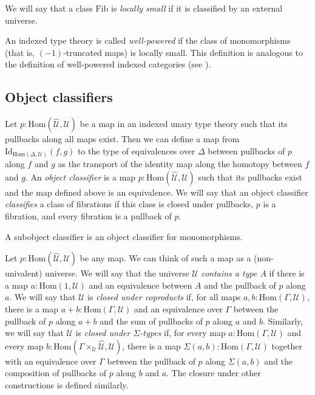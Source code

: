 \documentclass[reqno]{amsart}
\theoremstyle{definition}
\theoremstyle{remark}
\newcommand{\fs}[1]{\mathrm{#1}}
\newcommand{\Hom}{\fs{Hom}}
\newcommand{\Id}{\fs{Id}}
\newcommand{\Fib}{\fs{Fib}}
\numberwithin{figure}{section}
\begin{document}
\begin{defn}
We will say that a class $\Fib$ is \emph{locally small} if it is classified by an external universe.
\end{defn}

\begin{example}
An indexed type theory is called \emph{well-powered} if the class of monomorphisms (that is, $(-1)$-truncated maps) is locally small.
This definition is analogous to the definition of well-powered indexed categories (see \cite[Example~B1.3.14]{elephant}).
\end{example}

\subsection{Object classifiers}

Let $p : \Hom(\widehat{\mathcal{U}},\mathcal{U})$ be a map in an indexed unary type theory such that its pullbacks along all maps exist.
Then we can define a map from $\Id_{\Hom(\Delta,\mathcal{U})}(f,g)$ to the type of equivalences over $\Delta$ between pullbacks of $p$ along $f$ and $g$ as the transport of the identity map along the homotopy between $f$ and $g$.
An \emph{object classifier} is a map $p : \Hom(\widehat{\mathcal{U}},\mathcal{U})$ such that its pullbacks exist and the map defined above is an equivalence.
We will say that an object classifier \emph{classifies} a class of fibrations if this class is closed under pullbacks, $p$ is a fibration, and every fibration is a pullback of $p$.

\begin{example}
A subobject classifier is an object classifier for monomorphisms.
\end{example}

Let $p : \Hom(\widehat{\mathcal{U}},\mathcal{U})$ be any map.
We can think of such a map as a (non-univalent) universe.
We will say that the universe $\mathcal{U}$ \emph{contains a type $A$} if there is a map $a : \Hom(1,\mathcal{U})$ and an equivalence between $A$ and the pullback of $p$ along $a$.
We will say that $\mathcal{U}$ is \emph{closed under coproducts} if, for all maps $a,b : \Hom(\Gamma,\mathcal{U})$, there is a map $a + b : \Hom(\Gamma,\mathcal{U})$
and an equivalence over $\Gamma$ between the pullback of $p$ along $a + b$ and the sum of pullbacks of $p$ along $a$ and $b$.
Similarly, we will say that $\mathcal{U}$ is \emph{closed under $\Sigma$-types} if, for every map $a : \Hom(\Gamma,\mathcal{U})$
and every map $b : \Hom(\Gamma \times_\mathcal{U} \widehat{\mathcal{U}}, \mathcal{U})$, there is a map $\Sigma(a,b) : \Hom(\Gamma,\mathcal{U})$
together with an equivalence over $\Gamma$ between the pullback of $p$ along $\Sigma(a,b)$ and the composition of pullbacks of $p$ along $b$ and $a$.
The closure under other constructions is defined similarly.
\end{document}

